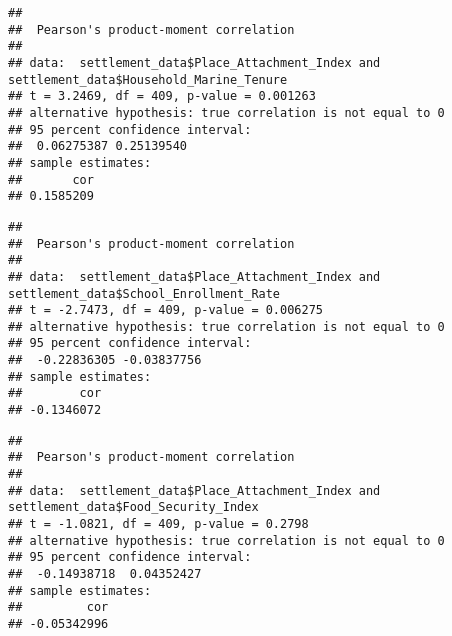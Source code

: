 \documentclass[
]{article}
\newenvironment{Shaded}{\begin{snugshade}}{\end{snugshade}}
\newcommand{\CommentTok}[1]{\textcolor[rgb]{0.56,0.35,0.01}{\textit{#1}}}
\newcommand{\FunctionTok}[1]{\textcolor[rgb]{0.13,0.29,0.53}{\textbf{#1}}}
\newcommand{\NormalTok}[1]{#1}
\newcommand{\SpecialCharTok}[1]{\textcolor[rgb]{0.81,0.36,0.00}{\textbf{#1}}}
\begin{document}
\begin{verbatim}
## 
##  Pearson's product-moment correlation
## 
## data:  settlement_data$Place_Attachment_Index and settlement_data$Household_Marine_Tenure
## t = 3.2469, df = 409, p-value = 0.001263
## alternative hypothesis: true correlation is not equal to 0
## 95 percent confidence interval:
##  0.06275387 0.25139540
## sample estimates:
##       cor 
## 0.1585209
\end{verbatim}

\begin{Shaded}
\end{Shaded}

\begin{verbatim}
## 
##  Pearson's product-moment correlation
## 
## data:  settlement_data$Place_Attachment_Index and settlement_data$School_Enrollment_Rate
## t = -2.7473, df = 409, p-value = 0.006275
## alternative hypothesis: true correlation is not equal to 0
## 95 percent confidence interval:
##  -0.22836305 -0.03837756
## sample estimates:
##        cor 
## -0.1346072
\end{verbatim}

\begin{Shaded}
\end{Shaded}

\begin{verbatim}
## 
##  Pearson's product-moment correlation
## 
## data:  settlement_data$Place_Attachment_Index and settlement_data$Food_Security_Index
## t = -1.0821, df = 409, p-value = 0.2798
## alternative hypothesis: true correlation is not equal to 0
## 95 percent confidence interval:
##  -0.14938718  0.04352427
## sample estimates:
##         cor 
## -0.05342996
\end{verbatim}

\begin{Shaded}
\end{Shaded}
\end{document}
